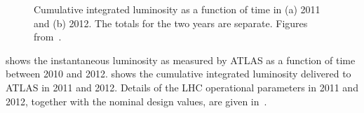 \begin{figure}[h]
\centering
\caption[Cumulative integrated luminosity as a function of time in
2011 and 2012.]{Cumulative integrated luminosity as a function of time in (a)
2011 and (b) 2012. The totals for the two years are separate. 
Figures from~\cite{atlaslumipublic}.}
\label{fig:lhc-int-lumi}
\end{figure}

 shows the instantaneous luminosity as measured by ATLAS as a
function of time between 2010 and 2012.  shows the cumulative
integrated luminosity delivered to ATLAS in 2011 and 2012.  Details of the LHC
operational parameters in 2011 and 2012, together with the nominal design
values, are given in~.




